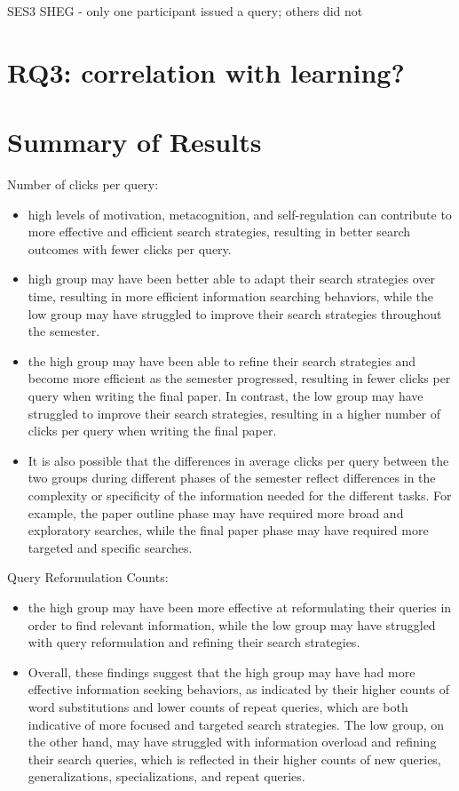 \documentclass[letterpaper, nobind]{templates/ociamthesis}
\providecommand{\tightlist}{%
  \setlength{\itemsep}{0pt}\setlength{\parskip}{0pt}}
\begin{document}
SES3 SHEG - only one participant issued a query; others did not

\hypertarget{rq3-correlation-with-learning}{%
\section{RQ3: correlation with learning?}\label{rq3-correlation-with-learning}}

\hypertarget{summary-of-results}{%
\section{Summary of Results}\label{summary-of-results}}

Number of clicks per query:

\begin{itemize}
\tightlist
\item
  high levels of motivation, metacognition, and self-regulation can contribute to more effective and efficient search strategies, resulting in better search outcomes with fewer clicks per query.
\item
  high group may have been better able to adapt their search strategies over time, resulting in more efficient information searching behaviors, while the low group may have struggled to improve their search strategies throughout the semester.
\item
  the high group may have been able to refine their search strategies and become more efficient as the semester progressed, resulting in fewer clicks per query when writing the final paper. In contrast, the low group may have struggled to improve their search strategies, resulting in a higher number of clicks per query when writing the final paper.
\item
  It is also possible that the differences in average clicks per query between the two groups during different phases of the semester reflect differences in the complexity or specificity of the information needed for the different tasks. For example, the paper outline phase may have required more broad and exploratory searches, while the final paper phase may have required more targeted and specific searches.
\end{itemize}

Query Reformulation Counts:

\begin{itemize}
\item
  the high group may have been more effective at reformulating their queries in order to find relevant information, while the low group may have struggled with query reformulation and refining their search strategies.
\item
  Overall, these findings suggest that the high group may have had more effective information seeking behaviors, as indicated by their higher counts of word substitutions and lower counts of repeat queries, which are both indicative of more focused and targeted search strategies. The low group, on the other hand, may have struggled with information overload and refining their search queries, which is reflected in their higher counts of new queries, generalizations, specializations, and repeat queries.
\end{itemize}
\end{document}
